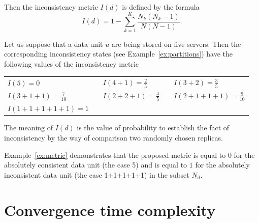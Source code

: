 \documentclass{llncs}
\begin{document}
Then the inconsistency metric $I(d)$ is defined by the formula
\begin{equation}\label{eq:metric}
	I(d)=1-\sum_{k=1}^K\dfrac{N_k(N_k-1)}{N(N-1)}.
\end{equation}

\begin{example}\label{ex:metric}
Let us suppose that a data unit $u$ are being stored on five servers.
Then the corresponding inconsistency states (see Example~\ref{ex:partitions}) have the following values of the inconsistency metric
\begin{center}
\begin{tabular}{lclcl}
	$I(5)=0$ & & $I(4+1)=\frac{2}{5}$ & & $I(3+2)=\frac{3}{5}$\\
	$I(3+1+1)=\frac{7}{10}$ &\hspace*{10pt}& $I(2+2+1)=\frac{4}{5}$
		&\hspace*{10pt}& $I(2+1+1+1)=\frac{9}{10}$\\
	$I(1+1+1+1+1)=1$
\end{tabular}
\end{center}
The meaning of $I(d)$ is the value of probability to establish the fact of inconsistency by the way of comparison two randomly chosen replicas.
\end{example}
Example~\ref{ex:metric} demonstrates that the proposed metric is equal to $0$ for the absolutely consistent data unit (the case 5) and is equal to $1$ for the absolutely inconsistent data unit (the case 1+1+1+1+1) in the subset $N_d$.


\section{Convergence time complexity}\label{sec:complexity}
\end{document}
